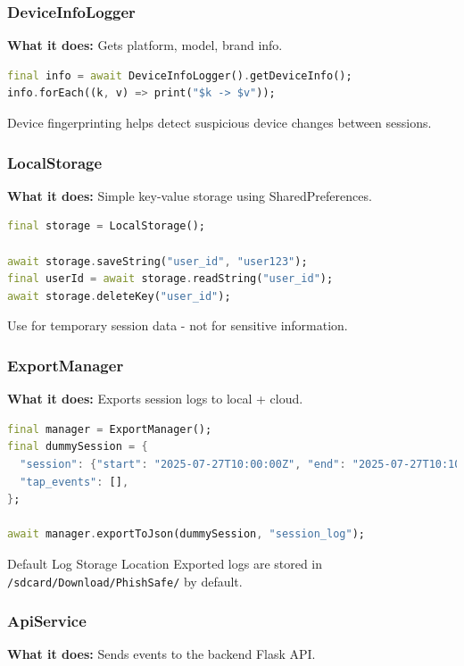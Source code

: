 \documentclass[11pt]{article}
\begin{document}
\subsubsection{DeviceInfoLogger}
\textbf{What it does:} Gets platform, model, brand info.

\begin{lstlisting}[language=Dart]
final info = await DeviceInfoLogger().getDeviceInfo();
info.forEach((k, v) => print("$k -> $v"));
\end{lstlisting}

Device fingerprinting helps detect suspicious device changes between sessions.

\subsubsection{LocalStorage}
\textbf{What it does:} Simple key-value storage using SharedPreferences.

\begin{lstlisting}[language=Dart]
final storage = LocalStorage();

await storage.saveString("user_id", "user123");
final userId = await storage.readString("user_id");
await storage.deleteKey("user_id");
\end{lstlisting}

Use for temporary session data - not for sensitive information.

\subsubsection{ExportManager}
\textbf{What it does:} Exports session logs to local + cloud.

\begin{lstlisting}[language=Dart]
final manager = ExportManager();
final dummySession = {
  "session": {"start": "2025-07-27T10:00:00Z", "end": "2025-07-27T10:10:00Z"},
  "tap_events": [],
};

await manager.exportToJson(dummySession, "session_log");
\end{lstlisting}

Default Log Storage Location
Exported logs are stored in \texttt{/sdcard/Download/PhishSafe/} by default.

\subsubsection{ApiService}
\textbf{What it does:} Sends events to the backend Flask API.
\end{document}
